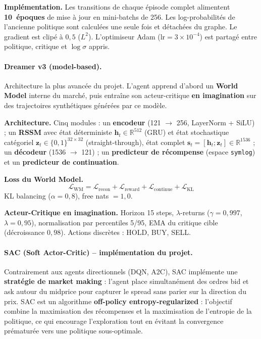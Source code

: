 \documentclass[11pt,a4paper]{article}
\begin{document}
\textbf{Implémentation.}
Les transitions de chaque épisode complet alimentent
\textbf{10~époques} de mise à jour en mini-batchs de
256. Les log-probabilités de l'ancienne politique sont
calculées une seule fois et détachées du graphe. Le
gradient est clipé à $0{,}5$ ($L^2$). L'optimiseur Adam
($\text{lr}=3\times10^{-4}$) est partagé entre politique,
critique et $\log\sigma$ appris.

\paragraph{Dreamer v3 (model-based).}
Architecture la plus avancée du projet. L'agent apprend
d'abord un \textbf{World Model} interne du marché, puis
entraîne son acteur-critique \textbf{en imagination} sur
des trajectoires synthétiques générées par ce modèle.

\textbf{Architecture.} Cinq modules : un \textbf{encodeur}
(121 $\to$ 256, LayerNorm + SiLU) ; un \textbf{RSSM} avec
état déterministe $\mathbf{h}_t \in \mathbb{R}^{512}$ (GRU)
et état stochastique catégoriel $\mathbf{z}_t \in
\{0,1\}^{32\times32}$ (straight-through), état complet
$\mathbf{s}_t = [\mathbf{h}_t;\mathbf{z}_t] \in
\mathbb{R}^{1536}$ ; un \textbf{décodeur} (1536 $\to$ 121) ;
un \textbf{predicteur de récompense} (espace \texttt{symlog})
et un \textbf{predicteur de continuation}.

\textbf{Loss du World Model.}
\[
\mathcal{L}_\text{WM} = \mathcal{L}_\text{recon}
+ \mathcal{L}_\text{reward}
+ \mathcal{L}_\text{continue}
+ \mathcal{L}_\text{KL}
\]
KL balancing ($\alpha=0{,}8$), free nats $=1{,}0$.

\textbf{Acteur-Critique en imagination.}
Horizon 15 steps, $\lambda$-returns ($\gamma=0{,}997$,
$\lambda=0{,}95$), normalisation par percentiles 5/95,
EMA du critique cible (décroissance $0{,}98$).
Actions discrètes : HOLD, BUY, SELL.

\paragraph{SAC (Soft Actor-Critic) -- implémentation du projet.}

Contrairement aux agents directionnels (DQN, A2C), SAC implémente une
\textbf{stratégie de market making} : l'agent place simultanément
des ordres bid et ask autour du midprice pour capturer le spread
sans parier sur la direction du prix. SAC est un algorithme
\textbf{off-policy entropy-regularized} : l'objectif combine la
maximisation des récompenses et la maximisation de l'entropie de
la politique, ce qui encourage l'exploration tout en évitant la
convergence prématurée vers une politique sous-optimale.
\end{document}
